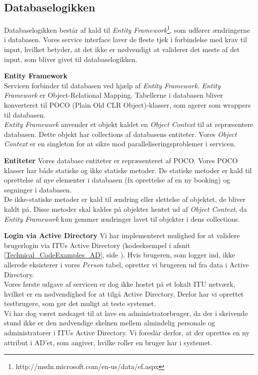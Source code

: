 \subsection*{Databaselogikken}
\label{Technical_service_database}
Databaselogikken består af kald til \textit{Entity Framework}\footnote{http://msdn.microsoft.com/en-us/data/ef.aspx}, som udfører ændringerne i databasen. Vores service interface laver de fleste tjek i forbindelse med krav til input, hvilket betyder, at det ikke er nødvendigt at validerer det meste af det input, som bliver givet til databaselogikken.

\textbf{Entity Framework}
\\Servicen forbinder til databasen ved hjælp af \textit{Entity Framework}. \textit{Entity Framework} er Object-Relational Mapping. Tabellerne i databasen bliver konverteret til POCO (Plain Old CLR Object)-klasser, som agerer som wrappers til databasen.
\\\textit{Entity Framework} anvender et objekt kaldet en \textit{Object Context} til at repræsentere databasen. Dette objekt har collections af databasens entiteter. Vores \textit{Object Context} er en singleton for at sikre mod paralleliseringsproblemer i servicen.

\textbf{Entiteter}
Vores database entiteter er repræsenteret af POCO. Vores POCO klasser har både statiske og ikke statiske metoder. De statiske metoder er kald til oprettelse af nye elementer i databasen (fx oprettelse af en ny booking) og søgninger i databasen. 
\\De ikke-statiske metoder er kald til ændring eller slettelse af objektet, de bliver kaldt på. Disse metoder skal kaldes på objekter hentet ud af \textit{Object Context}, da \textit{Entity Framework} kun gemmer ændringer lavet til objekter i dens collections.

\textbf{Login via Active Directory}
Vi har implementeret mulighed for at validere brugerlogin via ITUs Active Directory (kodeeksempel i afsnit \ref{Technical_CodeExamples_AD}, side \pageref{Technical_CodeExamples_AD}). Hvis brugeren, som logger ind, ikke allerede eksisterer i vores \textit{Person} tabel, opretter vi brugeren ud fra data i Active Directory.
\\Vores første udgave af servicen er dog ikke hostet på et lokalt ITU netværk, hvilket er en nødvendighed for at tilgå Active Directory. Derfor har vi oprettet testbrugere, som gør det muligt at teste systemet.
\\Vi har dog været nødsaget til at lave en administratorbruger, da der i skrivende stund ikke er den nødvendige skelnen mellem almindelig personale og administratorer i ITUs Active Directory. Vi foreslår derfor, at der oprettes en ny attribut i AD'et, som angiver, hvilke roller en bruger har i systemet.